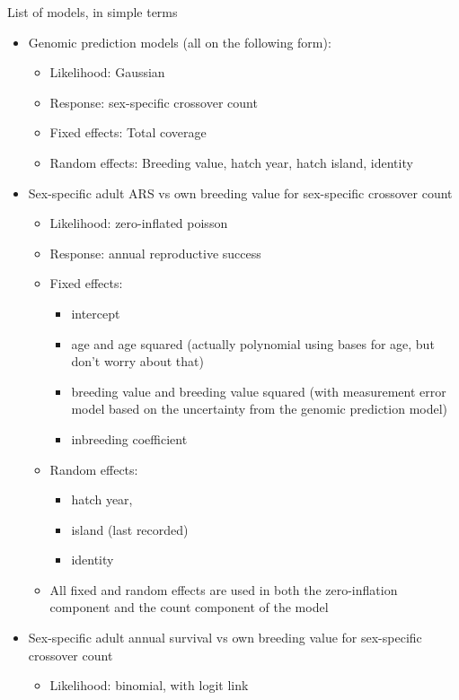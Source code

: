 \documentclass[dvipsnames]{article}
\begin{document}
\clearpage
List of models, in simple terms
\begin{itemize}
    \item Genomic prediction models (all on the following form): \begin{itemize}
        \item Likelihood: Gaussian
        \item Response: sex-specific crossover count
        \item Fixed effects: Total coverage
        \item Random effects: Breeding value, hatch year, hatch island, identity
    \end{itemize}
    \item Sex-specific adult ARS vs own breeding value for sex-specific crossover count \begin{itemize}
        \item Likelihood: zero-inflated poisson
        \item Response: annual reproductive success
        \item Fixed effects: \begin{itemize}
            \item intercept
            \item age and age squared (actually polynomial using bases for age, but don't worry about that)
            \item breeding value and breeding value squared (with measurement error model based on the uncertainty from the genomic prediction model)
            \item inbreeding coefficient
        \end{itemize} 
        \item Random effects: \begin{itemize}
            \item hatch year, 
            \item island (last recorded)
            \item identity
        \end{itemize}
        \item All fixed and random effects are used in both the zero-inflation component and the count component of the model
    \end{itemize}
    \item Sex-specific adult annual survival vs own breeding value for sex-specific crossover count \begin{itemize}
        \item Likelihood: binomial, with logit link

\end{itemize}
\end{itemize}
\end{document}
